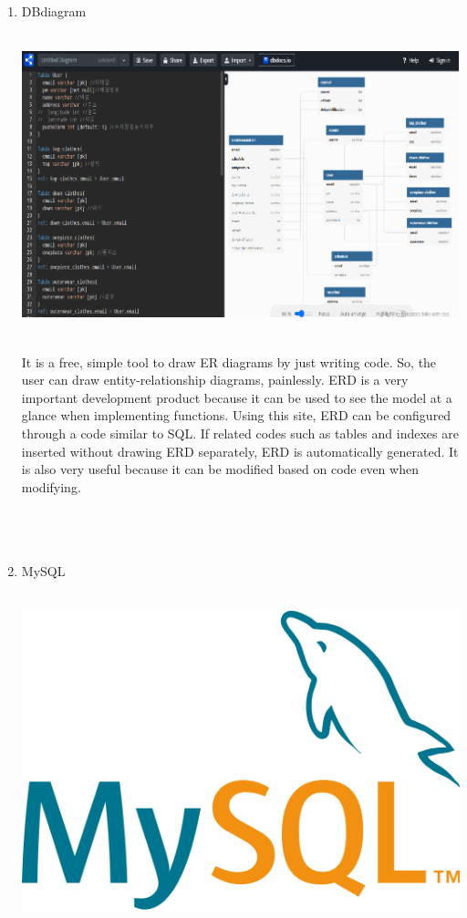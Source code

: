 \documentclass[conference]{IEEEtran}
\begin{document}
\begin{enumerate}
    \item DBdiagram \\ \\
\centerline{\includegraphics[scale=0.9]{DB.png}}
\\ It is a free, simple tool to draw ER diagrams by just writing code. So, the user can draw entity-relationship diagrams, painlessly. ERD is a very important development product because it can be used to see the model at a glance when implementing functions. Using this site, ERD can be configured through a code similar to SQL. If related codes such as tables and indexes are inserted without drawing ERD separately, ERD is automatically generated. It is also very useful because it can be modified based on code even when modifying.\\ \\ \\ \\
    \item MySQL \\ \\
\centerline{\includegraphics[scale=0.1]{MySQL.png}}

\end{enumerate}
\end{document}
